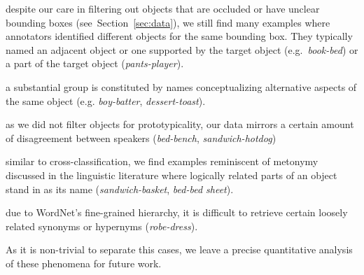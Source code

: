 \begin{description}
\setlength{\itemsep}{0pt}
\setlength{\parskip}{0pt}
\item[Referential uncertainty:] despite our care in filtering out objects that are occluded or have unclear bounding boxes (see\ Section~\ref{sec:data}), we still find many examples where annotators identified different objects for the same bounding box. They typically named an adjacent object or one supported by the target object (e.g.\ \textit{book-bed}) or a part of the target object (\textit{pants-player}).
\item[Cross-classification:] a substantial group is constituted by names conceptualizing alternative aspects of the same object (e.g. \textit{boy-batter}, \textit{dessert-toast}).
\item[Conceptual disagreement:] as we did not filter objects for prototypicality, our data mirrors a certain amount of disagreement between speakers (\textit{bed-bench}, \textit{sandwich-hotdog})
\item[Metonymy:] similar to cross-classification, we find examples reminiscent of metonymy discussed in the linguistic literature \cite{pustejovsky1991generative} where logically related parts of an object stand in as its name (\textit{sandwich-basket}, \textit{bed-bed sheet}). 
\item[Issues with WordNet:] due to WordNet's fine-grained hierarchy, it is difficult to retrieve certain loosely related synonyms or hypernyms (\textit{robe-dress}).
\end{description}

As it is non-trivial to separate this cases, we leave a precise quantitative analysis of these phenomena for future work.

